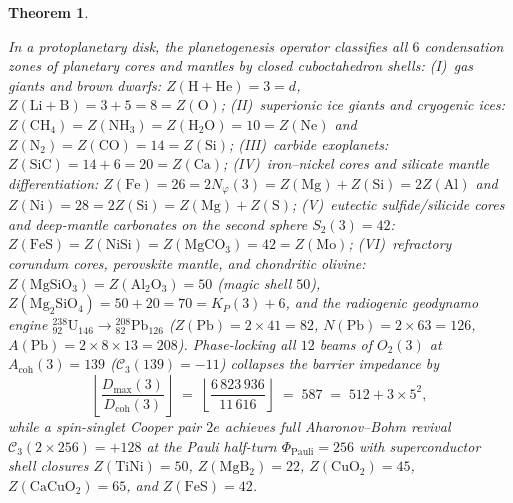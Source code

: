 \documentclass[11pt,a4paper]{article}
\theoremstyle{plain}
\newtheorem{theorem}{Theorem}[section]
\theoremstyle{definition}
\begin{document}
\begin{theorem}
\begin{enumerate}[label=\textbf{(\arabic*)},leftmargin=*]
  In a protoplanetary disk, the planetogenesis operator classifies all $6$ condensation zones of planetary cores and mantles by closed cuboctahedron shells: (I)~gas giants and brown dwarfs: $Z(\mathrm{H+He}) = 3 = d$, $Z(\mathrm{Li+B}) = 3 + 5 = 8 = Z(\mathrm{O})$; (II)~superionic ice giants and cryogenic ices: $Z(\mathrm{CH_4}) = Z(\mathrm{NH_3}) = Z(\mathrm{H_2O}) = 10 = Z(\mathrm{Ne})$ and $Z(\mathrm{N_2}) = Z(\mathrm{CO}) = 14 = Z(\mathrm{Si})$; (III)~carbide exoplanets: $Z(\mathrm{SiC}) = 14 + 6 = 20 = Z(\mathrm{Ca})$; (IV)~iron--nickel cores and silicate mantle differentiation: $Z(\mathrm{Fe}) = 26 = 2 N_\varphi(3) = Z(\mathrm{Mg}) + Z(\mathrm{Si}) = 2 Z(\mathrm{Al})$ and $Z(\mathrm{Ni}) = 28 = 2 Z(\mathrm{Si}) = Z(\mathrm{Mg}) + Z(\mathrm{S})$; (V)~eutectic sulfide/silicide cores and deep-mantle carbonates on the second sphere $S_2(3) = 42$: $Z(\mathrm{FeS}) = Z(\mathrm{NiSi}) = Z(\mathrm{MgCO_3}) = 42 = Z(\mathrm{Mo})$; (VI)~refractory corundum cores, perovskite mantle, and chondritic olivine: $Z(\mathrm{MgSiO_3}) = Z(\mathrm{Al_2O_3}) = 50$ (magic shell $50$), $Z(\mathrm{Mg_2SiO_4}) = 50 + 20 = 70 = K_P(3) + 6$, and the radiogenic geodynamo engine $^{238}_{92}\mathrm{U}_{146} \to {}^{208}_{82}\mathrm{Pb}_{126}$ ($Z(\mathrm{Pb}) = 2\times 41 = 82$, $N(\mathrm{Pb}) = 2\times 63 = 126$, $A(\mathrm{Pb}) = 2\times 8\times 13 = 208$). Phase-locking all $12$ beams of $O_2(3)$ at $A_{\mathrm{coh}}(3) = 139$ ($\mathcal{C}_3(139) = -11$) collapses the barrier impedance by
  \begin{equation}
    \label{eq:barrier-collapse-587}
    \left\lfloor\frac{D_{\max}(3)}{D_{\mathrm{coh}}(3)}\right\rfloor \;=\; \left\lfloor\frac{6\,823\,936}{11\,616}\right\rfloor \;=\; 587 \;=\; 512 + 3\times 5^2,
  \end{equation}
  while a spin-singlet Cooper pair $2e$ achieves full Aharonov--Bohm revival $\mathcal{C}_3(2\times 256) = +128$ at the Pauli half-turn $\Phi_{\mathrm{Pauli}} = 256$ with superconductor shell closures $Z(\mathrm{TiNi}) = 50$, $Z(\mathrm{MgB_2}) = 22$, $Z(\mathrm{CuO_2}) = 45$, $Z(\mathrm{CaCuO_2}) = 65$, and $Z(\mathrm{FeS}) = 42$.


\end{enumerate}
\end{theorem}
\end{document}
